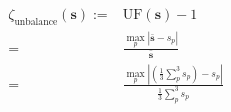 \begin{equation}
	\begin{split}
		\zeta_\text{unbalance}(\textbf{s}):=&\text{UF}(\textbf{s}) - 1\\
		=&\frac{\max_p\left|\bar{\textbf{s}} - s_p\right|}{\bar{\textbf{s}}}\\
		=&\frac{\max_p\left|\left(\frac{1}{3}\sum_p^3{s_p}\right) - s_p\right|}{\frac{1}{3}\sum_p^3{s_p}}
	\end{split}
	\label{ch1:equ:unbalance-cost}
\end{equation}